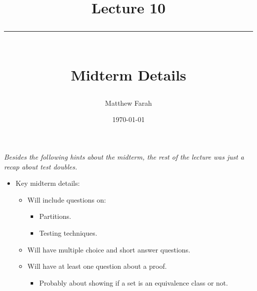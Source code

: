 \documentclass{article}
\date{
	\vspace{-.75em}
	{\large \today}
}
\title{
	\vspace*{-1.5em}
	{\Huge Lecture 10} \\
	\vspace{-1em}
	\rule{\textwidth/4}{.01em} \\
	\vspace{-.25em}
	{\Large Midterm Details}
	\vspace{-.75em}
}
\author{
	{\large Matthew Farah}
}
\begin{document}
\maketitle
\pagestyle{fancy}

\fi

\emph{Besides the following hints about the midterm, the rest of the lecture was just a recap about test doubles.} \\

\begin{itemize}
	\item Key midterm details:
	\begin{itemize}
		\item Will include questions on:
		\begin{itemize}
			\item Partitions.
			\item Testing techniques.
		\end{itemize}
		\item Will have multiple choice and short answer questions.
		\item Will have at least one question about a proof.
		\begin{itemize}
			\item Probably about showing if a set is an equivalence class or not.
		\end{itemize}
	\end{itemize}
\end{itemize}

\ifdefined\iscombined
	\newpage
\else
	
\end{document}
